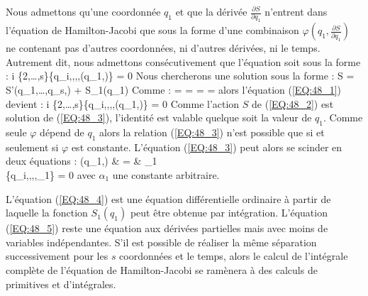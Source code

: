 Nous admettons qu'une coordonn\'{e}e $q_{1}$ et que la d\'{e}riv\'{e}e $\frac{\partial S}{\partial q_{1}}$ n'entrent dans l'\'{e}quation de Hamilton-Jacobi que sous la forme d'une combinaison $\varphi\left(q_{1},\frac{\partial S}{\partial q_{1}}\right)$ ne contenant pas d'autres coordonn\'{e}es, ni d'autres d\'{e}riv\'{e}es, ni le temps. Autrement dit, nous admettons cons\'{e}cutivement que l'\'{e}quation soit sous la forme :
\be
	\forall i \in \{2,\ldots,s\}\text{, }\Phi\left\{q_{i},,,,\varphi\left(q_{1},\right)\right\} = 0 \label{EQ:48_1}
\ee
Nous chercherons une solution sous la forme :
\be
	S = S'(q_{1},\ldots,q_{s},) + S_{1}(q_{1}) \label{EQ:48_2}
\ee
Comme :
\benn
	 = \text{, } =  =  = 
\eenn
alors l'\'{e}quation (\ref{EQ:48_1}) devient :
\be
	\forall i \in \{2,\ldots,s\}\text{, }\Phi\left\{q_{i},,,,\varphi\left(q_{1},\right)\right\} = 0 \label{EQ:48_3}
\ee
Comme l'action $S$ de (\ref{EQ:48_2}) est solution de (\ref{EQ:48_3}), l'identit\'{e} est valable quelque soit la valeur de $q_{1}$. Comme seule $\varphi$ d\'{e}pend de $q_{1}$ alors la relation (\ref{EQ:48_3}) n'est possible que si et seulement si $\varphi$ est constante. L'\'{e}quation (\ref{EQ:48_3}) peut alors se scinder en deux \'{e}quations :
\bea
	\varphi\left(q_{1},\right) & = & \alpha_{1} \label{EQ:48_4} \\
	\Phi\left\{q_{i},,,,\alpha_{1}\right\} = 0 \label{EQ:48_5}
\eea
avec $\alpha_{1}$ une constante arbitraire.

L'\'{e}quation (\ref{EQ:48_4}) est une \'{e}quation diff\'{e}rentielle ordinaire \`{a} partir de laquelle la fonction $S_{1}(q_{1})$ peut \^{e}tre obtenue par int\'{e}gration. L'\'{e}quation (\ref{EQ:48_5}) reste une \'{e}quation aux d\'{e}riv\'{e}es partielles mais avec moins de variables ind\'{e}pendantes. S'il est possible de r\'{e}aliser la m\^{e}me s\'{e}paration successivement pour les $s$ coordonn\'{e}es et le temps, alors le calcul de l'int\'{e}grale compl\`{e}te de l'\'{e}quation de Hamilton-Jacobi se ram\`{e}nera \`{a} des calculs de primitives et d'int\'{e}grales.

